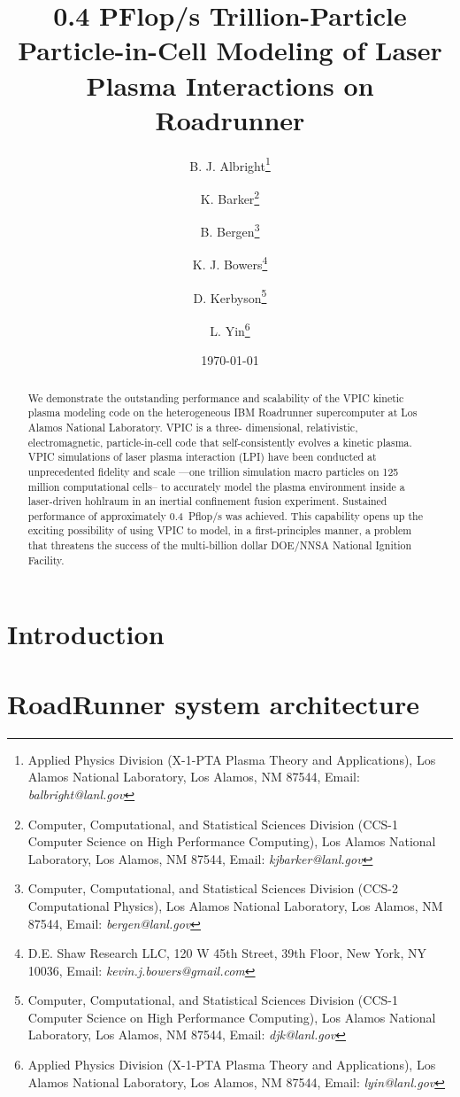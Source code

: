 \documentclass[letter,10pt]{article}
\title{0.4 PFlop/s Trillion-Particle Particle-in-Cell Modeling of Laser Plasma Interactions on Roadrunner}
\author{%
B. J. Albright\thanks{Applied Physics Division (X-1-PTA Plasma Theory and Applications), Los Alamos National Laboratory, Los Alamos, NM 87544, Email: \emph{balbright@lanl.gov}} \and%
%
K. Barker\thanks{Computer, Computational, and Statistical Sciences Division (CCS-1 Computer Science on High Performance Computing), Los Alamos National Laboratory, Los Alamos, NM 87544, Email: \emph{kjbarker@lanl.gov}} \and%
%
B. Bergen\thanks{Computer, Computational, and Statistical Sciences Division (CCS-2 Computational Physics), Los Alamos National Laboratory, Los Alamos, NM 87544, Email: \emph{bergen@lanl.gov}} \and%
%
K. J. Bowers\thanks{D.E. Shaw Research LLC, 120 W 45th Street, 39th Floor, New York, NY 10036, Email: \emph{kevin.j.bowers@gmail.com}} \and%
%
D. Kerbyson\thanks{Computer, Computational, and Statistical Sciences Division (CCS-1 Computer Science on High Performance Computing), Los Alamos National Laboratory, Los Alamos, NM 87544, Email: \emph{djk@lanl.gov}} \and%
%
L. Yin\thanks{Applied Physics Division (X-1-PTA Plasma Theory and Applications), Los Alamos National Laboratory, Los Alamos, NM 87544, Email: \emph{lyin@lanl.gov}}}
\date{\today}
\begin{document}
\maketitle
\thispagestyle{empty}

\begin{singlespace}
\begin{abstract}
We demonstrate the outstanding performance and scalability of the VPIC 
kinetic plasma modeling code on the heterogeneous IBM Roadrunner 
supercomputer at Los Alamos National Laboratory.  VPIC is a three-
dimensional, relativistic, electromagnetic, particle-in-cell code that 
self-consistently evolves a kinetic plasma.  VPIC simulations of laser 
plasma interaction (LPI) have been conducted at unprecedented fidelity 
and scale ---one trillion simulation macro particles on 125 million 
computational cells-- to accurately model the plasma environment 
inside a laser-driven hohlraum in an inertial confinement fusion 
experiment.   Sustained performance of approximately 0.4~Pflop/s was 
achieved.  This capability opens up the exciting possibility of using 
VPIC to model, in a first-principles manner, a problem that threatens 
the success of the multi-billion dollar DOE/NNSA National Ignition Facility.  
\end{abstract}
\end{singlespace}

\pagebreak

\section*{Introduction}

\section*{RoadRunner system architecture}
\end{document}
